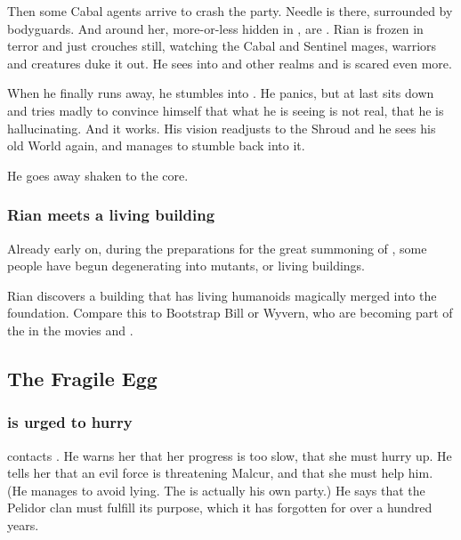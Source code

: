 \begin{garbage}
Then some Cabal agents arrive to crash the party. 
Needle is there, surrounded by bodyguards. 
And around her, more-or-less hidden in \Nyx, are \banerats{}. 
Rian is frozen in terror and just crouches still, watching the Cabal and Sentinel mages, warriors and creatures duke it out. 
He sees into \Nyx{} and other realms and is scared even more. 


When he finally runs away, he stumbles into \Nyx. 
He panics, but at last sits down and tries madly to convince himself that what he is seeing is not real, that he is hallucinating. 
And it works. 
His vision readjusts to the Shroud and he sees his old World again, and manages to stumble back into it. 

He goes away shaken to the core. 





\subsubsection{Rian meets a living building}
Already early on, during the preparations for the great summoning of \Nithd{}, some people have begun degenerating into mutants, or living buildings. 

Rian discovers a building that has living humanoids magically merged into the foundation. Compare this to Bootstrap Bill or Wyvern, who are becoming part of the  in the movies \cite{Movie:PiratesoftheCaribbean:II} and \cite{Movie:PiratesoftheCaribbean:III}. 









\subsection{The Fragile Egg}





\subsubsection{\Tiroco{} is urged to hurry}
\Psyrex{} contacts \Tiroco. 
He warns her that her progress is too slow, that she must hurry up. 
He tells her that an evil force is threatening Malcur, and that she must help him. 
(He manages to avoid lying. The  is actually his own party.) 
He says that the Pelidor clan must fulfill its purpose, which it has forgotten for over a hundred years. 






\end{garbage}
